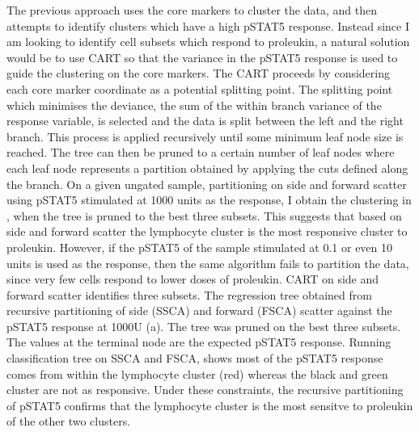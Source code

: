 The previous approach uses the core markers to cluster the data, and then attempts to identify clusters which have a high pSTAT5 response.
Instead since I am looking to identify cell subsets which respond to proleukin,
a natural solution would be to use \acrfull{CART} so that the variance in the pSTAT5 response is used to guide the clustering on the core markers.
The \gls{CART} proceeds by considering each core marker coordinate as a potential splitting point.
The splitting point which minimises the deviance, the sum of the within branch variance of the response variable,
is selected and the data is split between the left and the right branch.
This process is applied recursively until some minimum leaf node size is reached.
The tree can then be pruned to a certain number of leaf nodes where each leaf node represents a partition obtained by applying the cuts
defined along the branch.
On a given ungated sample, partitioning on side and forward scatter using pSTAT5 stimulated at 1000 units as the response,
I obtain the clustering in ,
when the tree is pruned to the best three subsets.
This suggests that based on side and forward scatter the lymphocyte cluster is the most responsive cluster to proleukin.
However, if the pSTAT5 of the sample stimulated at 0.1 or even 10 units is used as the response, then the same algorithm
fails to partition the data, since very few cells respond to lower doses of proleukin.
{ \gls{CART} on side and forward scatter identifies three subsets. }
{
The regression tree obtained from recursive partitioning of side (SSCA) and forward (FSCA) scatter against the pSTAT5 response at 1000U (a).
The tree was pruned on the best three subsets.
The values at the terminal node are the expected pSTAT5 response.
Running classification tree on SSCA and FSCA, shows most of the pSTAT5 response comes from within the lymphocyte cluster (red) whereas
the black and green cluster are not as responsive.
Under these constraints, the recursive partitioning of pSTAT5 confirms that the lymphocyte cluster is the most sensitve to proleukin
of the other two clusters.
} 
